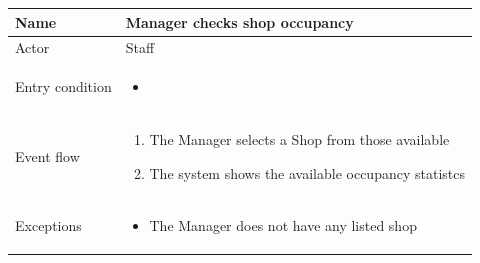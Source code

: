 \begin{table}[H]
    \begin{tabu} to \textwidth {|X|X[4]|}
        \hline
        Name            & Manager checks shop occupancy \\ \hline
        Actor           & Staff                         \\ \hline
        Entry condition & \begin{itemize}
            \item {}
        \end{itemize}    \\ \hline
        Event flow      & \begin{enumerate}
            \item The Manager selects a Shop from those available
            \item The system shows the available occupancy statistcs
        \end{enumerate}    \\ \hline
        Exceptions      & \begin{itemize}
            \item The Manager does not have any listed shop
        \end{itemize}    \\ \hline
    \end{tabu}
\end{table}

